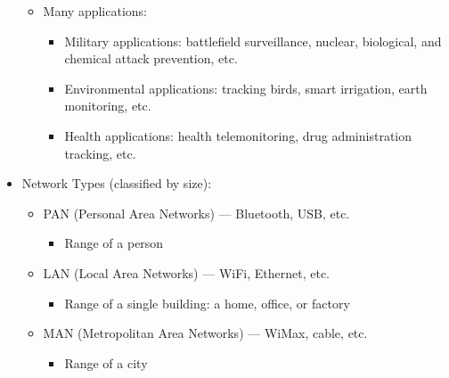 \begin{itemize}
    \begin{itemize}

      \item Many applications:

        \begin{itemize}

          \item Military applications: battlefield surveillance, nuclear, biological, and chemical attack prevention, etc.

          \item Environmental applications: tracking birds, smart irrigation, earth monitoring, etc.

          \item Health applications: health telemonitoring, drug administration tracking, etc.

        \end{itemize}

    \end{itemize}

  \item Network Types (classified by size):

    \begin{itemize}

      \item PAN (Personal Area Networks) — Bluetooth, USB, etc.

        \begin{itemize}

          \item Range of a person

        \end{itemize}

      \item LAN (Local Area Networks) — WiFi, Ethernet, etc.

        \begin{itemize}

          \item Range of a single building: a home, office, or factory

        \end{itemize}

      \item MAN (Metropolitan Area Networks) — WiMax, cable, etc.

        \begin{itemize}

          \item Range of a city


\end{itemize}
\end{itemize}
\end{itemize}
